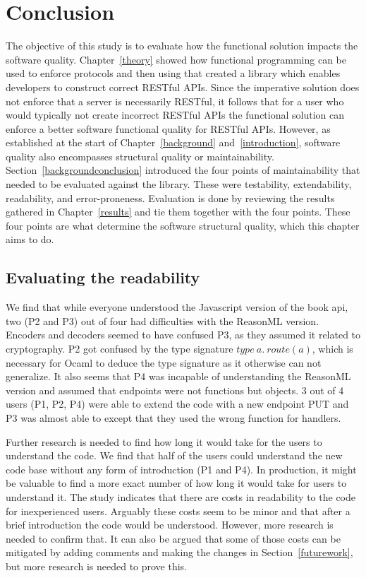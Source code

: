 \chapter{Conclusion}\label{conclusion}

 The objective of this study is to evaluate how the functional solution impacts
 the software quality. Chapter~\ref{theory} showed how functional programming
 can be used to enforce protocols and then using that created a library which
 enables developers to construct correct RESTful APIs. Since the imperative
 solution does not enforce that a server is necessarily RESTful, it follows that
 for a user who would typically not create incorrect RESTful APIs the functional
 solution can enforce a better software functional quality for RESTful APIs.
 However, as established at the start of Chapter~\ref{background}
 and~\ref{introduction}, software quality also encompasses structural quality or
 maintainability. Section~\ref{backgroundconclusion} introduced the four points
 of maintainability that needed to be evaluated against the library.  These were
 testability, extendability, readability, and error-proneness.  Evaluation is
 done by reviewing the results gathered in Chapter~\ref{results} and tie them
 together with the four points. These four points are what determine the
 software structural quality, which this chapter aims to do.

\section{Evaluating the readability}

We find that while everyone understood the Javascript version of the book api,
two (P2 and P3) out of four had difficulties with the ReasonML version.
Encoders and decoders seemed to have confused P3, as they assumed it related to
cryptography. P2 got confused by the type signature $type\ a.\ route(a)$, which
is necessary for Ocaml to deduce the type signature as it otherwise can not
generalize. It also seems that P4 was incapable of understanding the ReasonML
version and assumed that endpoints were not functions but objects.  3 out of 4
users (P1, P2, P4) were able to extend the code with a new endpoint PUT and P3
was almost able to except that they used the wrong function for handlers.

Further research is needed to find how long it would take for the users to
understand the code. We find that half of the users could understand the new
code base without any form of introduction (P1 and P4). In production, it might
be valuable to find a more exact number of how long it would take for users to
understand it.  The study indicates that there are costs in readability to the
code for inexperienced users. Arguably these costs seem to be minor and that
after a brief introduction the code would be understood. However, more research
is needed to confirm that. It can also be argued that some of those costs can be
mitigated by adding comments and making the changes in Section~\ref{futurework},
but more research is needed to prove this.

